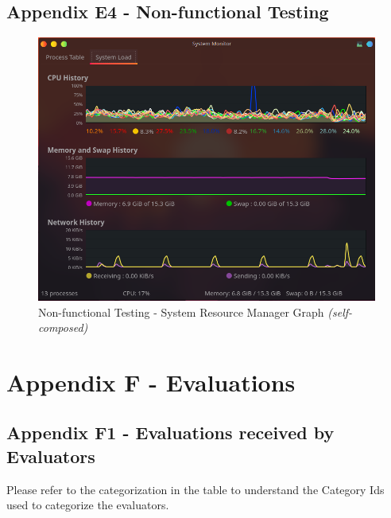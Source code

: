 \section*{Appendix E4 - Non-functional Testing}
\begin{figure}[h!]
\centering
\includegraphics[width=\textwidth]{images/Testing/system monitor2 cropped.png}
\caption{Non-functional Testing - System Resource Manager Graph \textit{(self-composed)}}
\label{fig:non-func-system-resource-manager}
\end{figure}


\chapter{Appendix F - Evaluations}
\label{appendix:evaluation}

\section*{Appendix F1 - Evaluations received by Evaluators}

Please refer to the categorization in the table \textit{\textbf{}} to understand the Category Ids used to categorize the evaluators.

